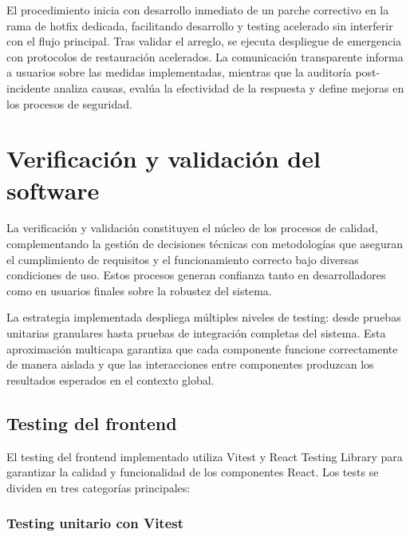 \documentclass[12pt,a4paper,oneside]{report}
\begin{document}
El procedimiento inicia con desarrollo inmediato de un parche correctivo en la rama de hotfix dedicada, facilitando desarrollo y testing acelerado sin interferir con el flujo principal. Tras validar el arreglo, se ejecuta despliegue de emergencia con protocolos de restauración acelerados. La comunicación transparente informa a usuarios sobre las medidas implementadas, mientras que la auditoría post-incidente analiza causas, evalúa la efectividad de la respuesta y define mejoras en los procesos de seguridad.

\section{Verificación y validación del
software}\label{verificaciuxf3n-y-validaciuxf3n-del-software}

La verificación y validación constituyen el núcleo de los procesos de calidad, complementando la gestión de decisiones técnicas con metodologías que aseguran el cumplimiento de requisitos y el funcionamiento correcto bajo diversas condiciones de uso. Estos procesos generan confianza tanto en desarrolladores como en usuarios finales sobre la robustez del sistema.

La estrategia implementada despliega múltiples niveles de testing: desde pruebas unitarias granulares hasta pruebas de integración completas del sistema. Esta aproximación multicapa garantiza que cada componente funcione correctamente de manera aislada y que las interacciones entre componentes produzcan los resultados esperados en el contexto global.

\subsection{Testing del frontend}\label{testing-del-frontend}

El testing del frontend implementado utiliza Vitest y React Testing Library para garantizar la calidad y funcionalidad de los componentes React. Los tests se dividen en tres categorías principales:

\subsubsection{Testing unitario con
Vitest}\label{testing-unitario-con-vitest}
\end{document}
